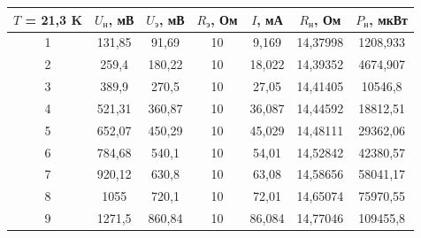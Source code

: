 \documentclass[a4paper, 12pt]{article} %
\begin{document}
\begin{center}
\begin{tabular}{|c|c|c|c|c|c|c|}
\hline
\textbf{$T$ = 21,3 K} & $U_\text{н}$, мВ & $U_\text{э}$, мВ & $R_\text{э}$, Ом & $I$, мА & $R_\text{н}$, Ом & $P_\text{н}$, мкВт \\ \hline
1                     & 131,85           & 91,69           & 10               & 9,169   & 14,37998         & 1208,933         \\ \hline
2                     & 259,4            & 180,22          & 10               & 18,022  & 14,39352         & 4674,907         \\ \hline
3                     & 389,9            & 270,5           & 10               & 27,05   & 14,41405         & 10546,8          \\ \hline
4                     & 521,31           & 360,87          & 10               & 36,087  & 14,44592         & 18812,51         \\ \hline
5                     & 652,07           & 450,29          & 10               & 45,029  & 14,48111         & 29362,06         \\ \hline
6                     & 784,68           & 540,1           & 10               & 54,01   & 14,52842         & 42380,57         \\ \hline
7                     & 920,12           & 630,8           & 10               & 63,08   & 14,58656         & 58041,17         \\ \hline
8                     & 1055             & 720,1           & 10               & 72,01   & 14,65074         & 75970,55         \\ \hline
9                     & 1271,5           & 860,84          & 10               & 86,084  & 14,77046         & 109455,8         \\ \hline
\end{tabular}
\end{center}
\end{document}
